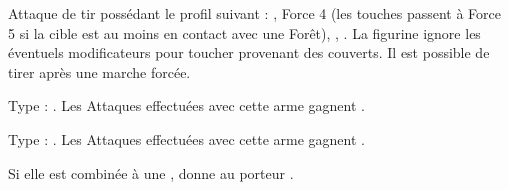 \listitemonecol{\impalingroots} Attaque de tir possédant le profil suivant : , Force 4 (les touches passent à Force 5 si la cible est au moins en contact avec une Forêt), , \quicktofire{}. La figurine ignore les éventuels modificateurs pour toucher provenant des couverts. Il est possible de tirer après une marche forcée.

\listitemonecol{\sylvanlance} Type : \lightlance. Les Attaques effectuées avec cette arme gagnent .

\listitemonecol{\sylvanblades} Type : \pw. Les Attaques effectuées avec cette arme gagnent .

\listitemonecol{\elvencloak} Si elle est combinée à une \la{}, donne au porteur .

\enditemlistonecol

\closearmyarmoury

